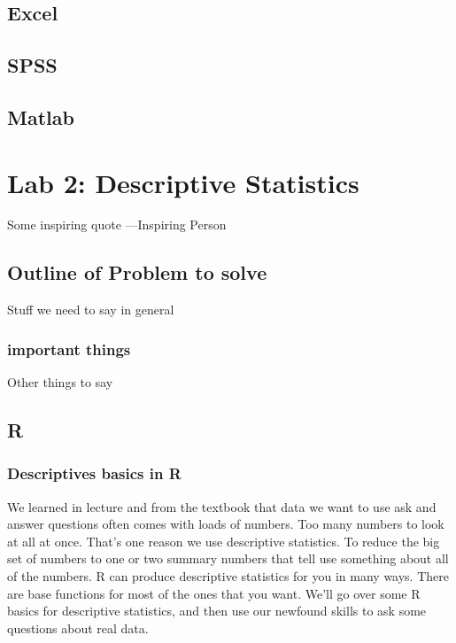 \documentclass[]{book}
\theoremstyle{definition}
\theoremstyle{definition}
\theoremstyle{definition}
\theoremstyle{remark}
\begin{document}
\section{Excel}\label{excel}

\section{SPSS}\label{spss}

\section{Matlab}\label{matlab}

\chapter{Lab 2: Descriptive
Statistics}\label{lab-2-descriptive-statistics}

{ Some inspiring quote ---Inspiring Person }

\section{Outline of Problem to solve}\label{outline-of-problem-to-solve}

Stuff we need to say in general

\subsection{important things}\label{important-things}

Other things to say

\section{R}\label{r-2}

\subsection{Descriptives basics in R}\label{descriptives-basics-in-r}

We learned in lecture and from the textbook that data we want to use ask
and answer questions often comes with loads of numbers. Too many numbers
to look at all at once. That's one reason we use descriptive statistics.
To reduce the big set of numbers to one or two summary numbers that tell
use something about all of the numbers. R can produce descriptive
statistics for you in many ways. There are base functions for most of
the ones that you want. We'll go over some R basics for descriptive
statistics, and then use our newfound skills to ask some questions about
real data.
\end{document}
